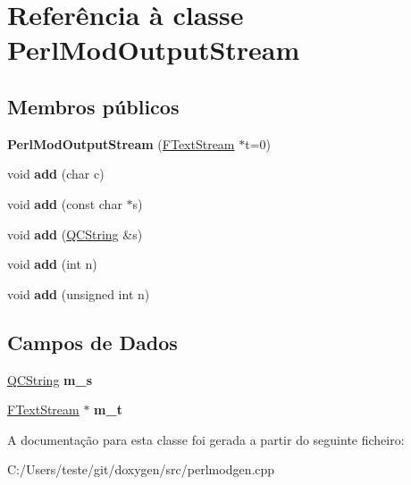 \hypertarget{class_perl_mod_output_stream}{\section{Referência à classe Perl\-Mod\-Output\-Stream}
\label{class_perl_mod_output_stream}
}
\subsection*{Membros públicos}
\begin{DoxyCompactItemize}
\item 
\hypertarget{class_perl_mod_output_stream_abdcc9d65275a60ded6e0a1deb66da328}{{\bfseries Perl\-Mod\-Output\-Stream} (\hyperlink{class_f_text_stream}{F\-Text\-Stream} $\ast$t=0)}\label{class_perl_mod_output_stream_abdcc9d65275a60ded6e0a1deb66da328}

\item 
\hypertarget{class_perl_mod_output_stream_a3c8259b1ea708adbf25ed145ceb6b4de}{void {\bfseries add} (char c)}\label{class_perl_mod_output_stream_a3c8259b1ea708adbf25ed145ceb6b4de}

\item 
\hypertarget{class_perl_mod_output_stream_aac8a7eb763e902fcd2284a1ce973205d}{void {\bfseries add} (const char $\ast$s)}\label{class_perl_mod_output_stream_aac8a7eb763e902fcd2284a1ce973205d}

\item 
\hypertarget{class_perl_mod_output_stream_a1d9efba676fa5d8f32524feee933db89}{void {\bfseries add} (\hyperlink{class_q_c_string}{Q\-C\-String} \&s)}\label{class_perl_mod_output_stream_a1d9efba676fa5d8f32524feee933db89}

\item 
\hypertarget{class_perl_mod_output_stream_aca50fa4c964268eff771503bb23191d9}{void {\bfseries add} (int n)}\label{class_perl_mod_output_stream_aca50fa4c964268eff771503bb23191d9}

\item 
\hypertarget{class_perl_mod_output_stream_a36d519358c5321f582735448ed55939b}{void {\bfseries add} (unsigned int n)}\label{class_perl_mod_output_stream_a36d519358c5321f582735448ed55939b}

\end{DoxyCompactItemize}
\subsection*{Campos de Dados}
\begin{DoxyCompactItemize}
\item 
\hypertarget{class_perl_mod_output_stream_a88543ddc32c82a048161ce7d1fdb7ede}{\hyperlink{class_q_c_string}{Q\-C\-String} {\bfseries m\-\_\-s}}\label{class_perl_mod_output_stream_a88543ddc32c82a048161ce7d1fdb7ede}

\item 
\hypertarget{class_perl_mod_output_stream_adb6fd6689b60fd06c3b935be553d83ba}{\hyperlink{class_f_text_stream}{F\-Text\-Stream} $\ast$ {\bfseries m\-\_\-t}}\label{class_perl_mod_output_stream_adb6fd6689b60fd06c3b935be553d83ba}

\end{DoxyCompactItemize}


A documentação para esta classe foi gerada a partir do seguinte ficheiro\-:\begin{DoxyCompactItemize}
\item 
C\-:/\-Users/teste/git/doxygen/src/perlmodgen.\-cpp\end{DoxyCompactItemize}
